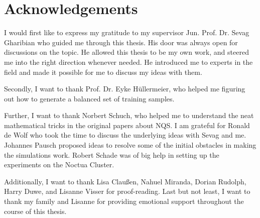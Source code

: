 \chapter*{Acknowledgements}

I would first like to express my gratitude to my supervisor 
Jun. Prof. Dr. Sevag Gharibian who guided me through this 
thesis. His door was always open for discussions on the topic. 
He allowed this thesis to be my own work, and steered me into the right direction
whenever needed. He introduced me to experts in the field and made it possible 
for me to discuss my ideas with them.

Secondly, I want to thank Prof. Dr. Eyke H{\"u}llermeier, who 
helped me figuring out how to generate a balanced set of training samples.

Further, I want to thank Norbert Schuch, who helped me to understand the neat 
mathematical tricks in the original papers about NQS. I am grateful for Ronald de Wolf who 
took the time to discuss the underlying ideas with Sevag and me. 
Johannes Pausch proposed ideas to resolve some of the initial obstacles
in making the simulations work. Robert Schade was of big help in setting 
up the experiments on the Noctua Cluster.

Additionally, I want to thank Lisa Clau{\ss}en, Nahuel Miranda, Dorian Rudolph, Harry Duwe,
and Lisanne Visser for proof-reading. Last but not least, I want to thank my family 
and Lisanne for providing emotional support throughout the course of this thesis.